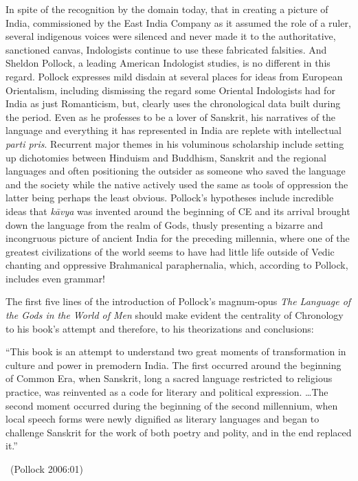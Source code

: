 In spite of the recognition by the domain today, that in creating a picture of India, commissioned by the East India Company as it assumed the role of a ruler, several indigenous voices were silenced and never made it to the authoritative, sanctioned canvas, Indologists continue to use these fabricated falsities. And Sheldon Pollock, a leading American Indologist studies, is no different in this regard. Pollock expresses mild disdain at several places for ideas from European Orientalism, including dismissing the regard some Oriental Indologists had for India as just Romanticism, but, clearly uses the chronological data built during the period. Even as he professes to be a lover of Sanskrit, his narratives of the language and everything it has represented in India are replete with intellectual \textit{parti pris}. Recurrent major themes in his voluminous scholarship include setting up dichotomies between Hinduism and Buddhism, Sanskrit and the regional languages and often positioning the outsider as someone who saved the language and the society while the native actively used the same as tools of oppression the latter being perhaps the least obvious. Pollock’s hypotheses include incredible ideas that \textit{kāvya} was invented around the beginning of CE and its arrival brought down the language from the realm of Gods, thusly presenting a bizarre and incongruous picture of ancient India for the preceding millennia, where one of the greatest civilizations of the world seems to have had little life outside of Vedic chanting and oppressive Brahmanical paraphernalia, which, according to Pollock, includes even grammar!

The first five lines of the introduction of Pollock’s magnum-opus \textit{The Language of the Gods in the World of Men} should make evident the centrality of Chronology to his book’s attempt and therefore, to his theorizations and conclusions:

\begin{myquote}
“This book is an attempt to understand two great moments of transformation in culture and power in premodern India. The first occurred around the beginning of Common Era, when Sanskrit, long a sacred language restricted to religious practice, was reinvented as a code for literary and political expression. …The second moment occurred during the beginning of the second millennium, when local speech forms were newly dignified as literary languages and began to challenge Sanskrit for the work of both poetry and polity, and in the end replaced it.” 

~\hfill (Pollock 2006:01)
\end{myquote}

